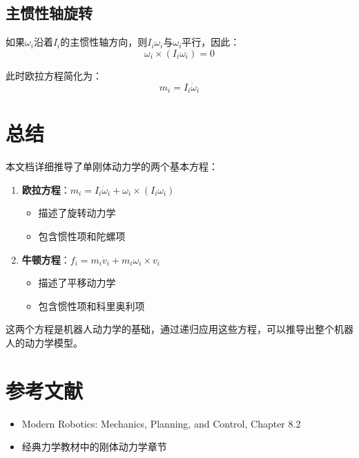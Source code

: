\documentclass[12pt,a4paper]{article}
\begin{document}
\subsection{主惯性轴旋转}

如果$\omega_i$沿着$I_i$的主惯性轴方向，则$I_i \omega_i$与$\omega_i$平行，因此：
\begin{equation}
\omega_i \times (I_i \omega_i) = 0
\end{equation}

此时欧拉方程简化为：
\begin{equation}
m_i = I_i \dot{\omega}_i
\end{equation}

\section{总结}

本文档详细推导了单刚体动力学的两个基本方程：

\begin{enumerate}
\item \textbf{欧拉方程}：$m_i = I_i \dot{\omega}_i + \omega_i \times (I_i \omega_i)$
\begin{itemize}
\item 描述了旋转动力学
\item 包含惯性项和陀螺项
\end{itemize}

\item \textbf{牛顿方程}：$f_i = m_i \dot{v}_i + m_i \omega_i \times v_i$
\begin{itemize}
\item 描述了平移动力学
\item 包含惯性项和科里奥利项
\end{itemize}
\end{enumerate}

这两个方程是机器人动力学的基础，通过递归应用这些方程，可以推导出整个机器人的动力学模型。

\section{参考文献}

\begin{itemize}
\item Modern Robotics: Mechanics, Planning, and Control, Chapter 8.2
\item 经典力学教材中的刚体动力学章节
\end{itemize}
\end{document}
